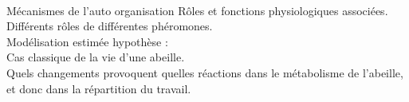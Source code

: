 		\paragraph{}
		Mécanismes de l'auto organisation
			Rôles et fonctions physiologiques associées.\\
			Différents rôles de différentes phéromones.\\
			Modélisation estimée hypothèse : \\
			Cas classique de la vie d'une abeille.\\
			Quels changements provoquent quelles réactions dans le métabolisme de l'abeille, et donc dans la répartition du travail.
			
	